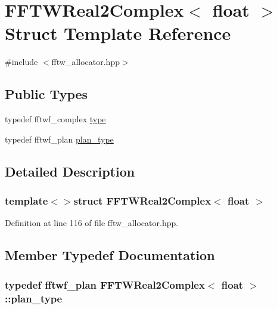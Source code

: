 \hypertarget{struct_f_f_t_w_real2_complex_3_01float_01_4}{\section{F\-F\-T\-W\-Real2\-Complex$<$ float $>$ Struct Template Reference}
\label{struct_f_f_t_w_real2_complex_3_01float_01_4}
}


{\ttfamily \#include $<$fftw\-\_\-allocator.\-hpp$>$}

\subsection*{Public Types}
\begin{DoxyCompactItemize}
\item 
typedef fftwf\-\_\-complex \hyperlink{struct_f_f_t_w_real2_complex_3_01float_01_4_aa0fdfacb991acafebd4366d8d96d89e2}{type}
\item 
typedef fftwf\-\_\-plan \hyperlink{struct_f_f_t_w_real2_complex_3_01float_01_4_aade64b56ea2e005126313afd2427094b}{plan\-\_\-type}
\end{DoxyCompactItemize}


\subsection{Detailed Description}
\subsubsection*{template$<$$>$struct F\-F\-T\-W\-Real2\-Complex$<$ float $>$}



Definition at line 116 of file fftw\-\_\-allocator.\-hpp.



\subsection{Member Typedef Documentation}
\hypertarget{struct_f_f_t_w_real2_complex_3_01float_01_4_aade64b56ea2e005126313afd2427094b}{
\subsubsection[{plan\-\_\-type}]{\setlength{\rightskip}{0pt plus 5cm}typedef fftwf\-\_\-plan {\bf F\-F\-T\-W\-Real2\-Complex}$<$ float $>$\-::{\bf plan\-\_\-type}}}\label{struct_f_f_t_w_real2_complex_3_01float_01_4_aade64b56ea2e005126313afd2427094b}


